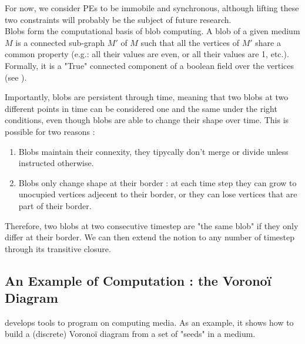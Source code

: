 \documentclass{article}
\begin{document}
For now, we consider PEs to be immobile and synchronous, although lifting these two constraints will probably be the subject of future research.\\

Blobs form the computational basis of blob computing. A blob of a given medium $M$ is a connected sub-graph $M'$ of $M$ such that all the vertices of $M'$ share a common property (e.g.: all their values are even, or all their values are 1, etc.). Formally, it is a "True" connected component of a boolean field over the vertices (see \cite{blob_computing2}).

Importantly, blobs are persistent through time, meaning that two blobs at two different points in time can be considered one and the same under the right conditions, even though blobs are able to change their shape over time. This is possible for two reasons :
\begin{enumerate}
	\item Blobs maintain their connexity, they tipycally don't merge or divide unless instructed otherwise.
	\item Blobs only change shape at their border : at each time step they can grow to unocupied vertices adjecent to their border, or they can lose vertices that are part of their border.
\end{enumerate}
Therefore, two blobs at two consecutive timestep are "the same blob" if they only differ at their border. We can then extend the notion to any number of timestep through its transitive closure.

\subsection{An Example of Computation : the Voronoï Diagram}

\cite{Voronoi} develops tools to program on computing media. As an example, it shows how to build a (discrete) Voronoï diagram from a set of "seeds" in a medium.
\end{document}
